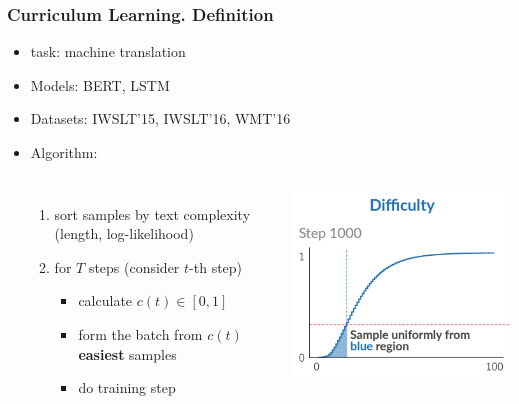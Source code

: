 \documentclass{beamer}
\begin{document}
\begin{frame}
	\frametitle{Curriculum Learning. Definition}
	\begin{itemize}
		\item task: machine translation
		\item Models: BERT, LSTM
		\item Datasets: IWSLT'15, IWSLT'16, WMT'16
		\item Algorithm:
		\begin{columns}
			\begin{enumerate}
				\item sort samples by text complexity (length, log-likelihood)
				\item for $T$ steps (consider $t$-th step)
				\begin{itemize}
					\item calculate $c(t) \in [0, 1]$
					\item form the batch from $c(t)$ {\bf easiest} samples
					\item do training step
				\end{itemize}
			\end{enumerate}
			\includegraphics[scale=0.4]{acl19_algo.png}
		\end{columns}
	\end{itemize}
\end{frame}
\end{document}
